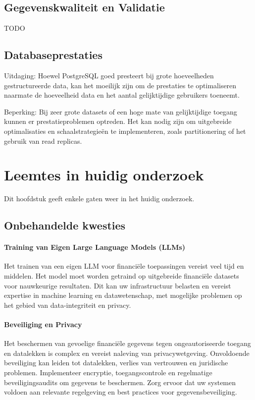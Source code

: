 \subsection{Gegevenskwaliteit en Validatie}
TODO
\subsection{Databaseprestaties}
Uitdaging: Hoewel PostgreSQL goed presteert bij grote hoeveelheden gestructureerde data, kan het moeilijk zijn om de prestaties te optimaliseren naarmate de hoeveelheid data en het aantal gelijktijdige gebruikers toeneemt.

Beperking: Bij zeer grote datasets of een hoge mate van gelijktijdige toegang kunnen er prestatieproblemen optreden. Het kan nodig zijn om uitgebreide optimalisaties en schaalstrategieën te implementeren, zoals partitionering of het gebruik van read replicas.
\section{Leemtes in huidig onderzoek}
Dit hoofdstuk geeft enkele gaten weer in het huidig onderzoek.
\subsection{Onbehandelde kwesties}
\paragraph{Training van Eigen Large Language Models (LLMs)}
Het trainen van een eigen LLM voor financiële toepassingen vereist veel tijd en middelen. Het model moet worden getraind op uitgebreide financiële datasets voor nauwkeurige resultaten. Dit kan uw infrastructuur belasten en vereist expertise in machine learning en datawetenschap, met mogelijke problemen op het gebied van data-integriteit en privacy.

\paragraph{Beveiliging en Privacy}
Het beschermen van gevoelige financiële gegevens tegen ongeautoriseerde toegang en datalekken is complex en vereist naleving van privacywetgeving. Onvoldoende beveiliging kan leiden tot datalekken, verlies van vertrouwen en juridische problemen. Implementeer encryptie, toegangscontrole en regelmatige beveiligingsaudits om gegevens te beschermen. Zorg ervoor dat uw systemen voldoen aan relevante regelgeving en best practices voor gegevensbeveiliging.

